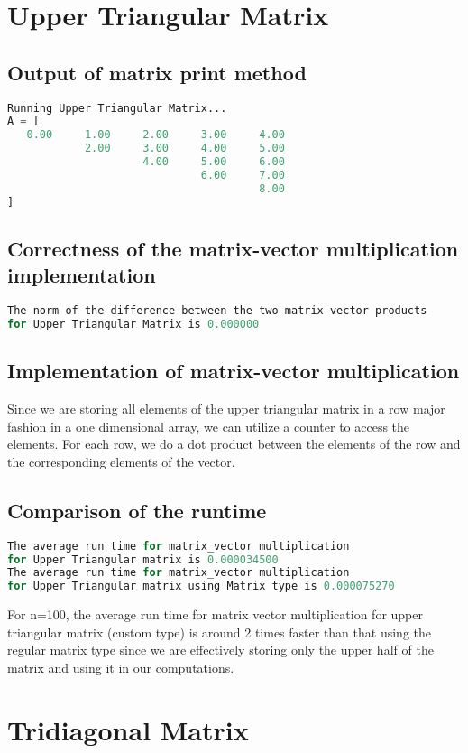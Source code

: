 \documentclass{article}
\begin{document}
\section{Upper Triangular Matrix}
\subsection{Output of matrix print method} 
\begin{lstlisting}[language=awk]
Running Upper Triangular Matrix...
A = [
   0.00     1.00     2.00     3.00     4.00
            2.00     3.00     4.00     5.00
                     4.00     5.00     6.00
                              6.00     7.00
                                       8.00
]
\end{lstlisting}
\subsection{Correctness of the matrix-vector multiplication implementation}
\begin{lstlisting}[language=awk]
The norm of the difference between the two matrix-vector products 
for Upper Triangular Matrix is 0.000000
\end{lstlisting}
\subsection{Implementation of matrix-vector multiplication}
Since we are storing all elements of the upper triangular matrix in a row major fashion in a one dimensional array, we can utilize a counter to access the elements. For each row, we do a dot product between the elements of the row and the corresponding elements of the vector.
\subsection{Comparison of the runtime}
\begin{lstlisting}[language=awk]
The average run time for matrix_vector multiplication 
for Upper Triangular matrix is 0.000034500
The average run time for matrix_vector multiplication 
for Upper Triangular matrix using Matrix type is 0.000075270
\end{lstlisting}
For n=100, the average run time for matrix vector multiplication for upper triangular matrix (custom type) is around 2 times faster than that using the regular matrix type since we are effectively storing only the upper half of the matrix and using it in our computations. 
\section{Tridiagonal Matrix}
\end{document}
